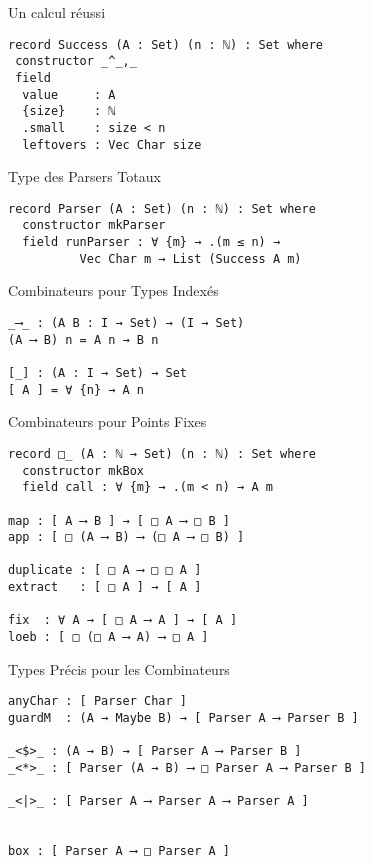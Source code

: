 \documentclass{beamer}
\begin{document}
\begin{frame}[fragile]{Un calcul réussi}
\begin{verbatim}
record Success (A : Set) (n : ℕ) : Set where
 constructor _^_,_
 field
  value     : A
  {size}    : ℕ
  .small    : size < n
  leftovers : Vec Char size
\end{verbatim}
\end{frame}


\begin{frame}[fragile]{Type des Parsers Totaux}
\begin{verbatim}
record Parser (A : Set) (n : ℕ) : Set where
  constructor mkParser
  field runParser : ∀ {m} → .(m ≤ n) →
          Vec Char m → List (Success A m)
\end{verbatim}
\end{frame}

\begin{frame}[fragile]{Combinateurs pour Types Indexés}
\begin{verbatim}
_⟶_ : (A B : I → Set) → (I → Set)
(A ⟶ B) n = A n → B n

[_] : (A : I → Set) → Set
[ A ] = ∀ {n} → A n
\end{verbatim}
\end{frame}


\begin{frame}[fragile]{Combinateurs pour Points Fixes}
\begin{verbatim}
record □_ (A : ℕ → Set) (n : ℕ) : Set where
  constructor mkBox
  field call : ∀ {m} → .(m < n) → A m

map : [ A ⟶ B ] → [ □ A ⟶ □ B ]
app : [ □ (A ⟶ B) ⟶ (□ A ⟶ □ B) ]

duplicate : [ □ A ⟶ □ □ A ]
extract   : [ □ A ] → [ A ]

fix  : ∀ A → [ □ A ⟶ A ] → [ A ]
loeb : [ □ (□ A ⟶ A) ⟶ □ A ]
\end{verbatim}
\end{frame}

\begin{frame}[fragile]{Types Précis pour les Combinateurs}
\begin{verbatim}
anyChar : [ Parser Char ]
guardM  : (A → Maybe B) → [ Parser A ⟶ Parser B ]

_<$>_ : (A → B) → [ Parser A ⟶ Parser B ]
_<*>_ : [ Parser (A → B) ⟶ □ Parser A ⟶ Parser B ]

_<|>_ : [ Parser A ⟶ Parser A ⟶ Parser A ]


box : [ Parser A ⟶ □ Parser A ]
\end{verbatim}
\end{frame}
\end{document}
